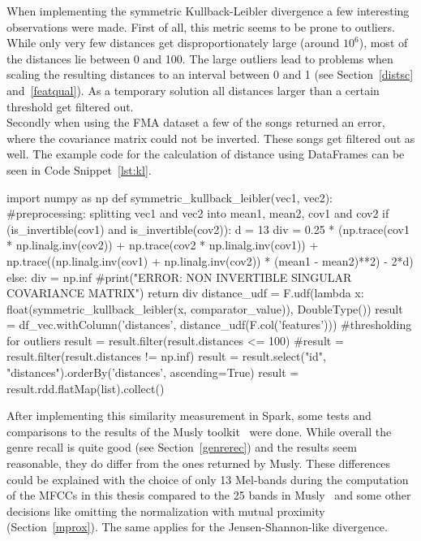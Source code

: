 When implementing the symmetric Kullback-Leibler divergence a few interesting observations were made. First of all, this metric seems to be prone to outliers. While only very few distances get disproportionately large (around $10^6$), most of the distances lie between 0 and 100. The large outliers lead to problems when scaling the resulting distances to an interval between 0 and 1 (see Section~\ref{distsc} and~\ref{featqual}). As a temporary solution all distances larger than a certain threshold get filtered out.\\ 
Secondly when using the FMA dataset a few of the songs returned an error, where the covariance matrix could not be inverted. 
These songs get filtered out as well. The example code for the calculation of distance using DataFrames can be seen in Code Snippet~\ref{lst:kl}. 

\begin{pythonCode}[frame=single,label={lst:kl},caption={Kullback-Leibler divergence},captionpos=b]
import numpy as np
def symmetric_kullback_leibler(vec1, vec2):
	#preprocessing: splitting vec1 and vec2 into mean1, mean2, cov1 and cov2
	if (is_invertible(cov1) and is_invertible(cov2)):
		d = 13
		div = 0.25 * (np.trace(cov1 * np.linalg.inv(cov2)) + np.trace(cov2 * np.linalg.inv(cov1)) + np.trace((np.linalg.inv(cov1) + np.linalg.inv(cov2)) * (mean1 - mean2)**2) - 2*d)
	else: 
		div = np.inf
		#print("ERROR: NON INVERTIBLE SINGULAR COVARIANCE MATRIX\n")  
	return div
distance_udf = F.udf(lambda x: float(symmetric_kullback_leibler(x, comparator_value)), DoubleType())
result = df_vec.withColumn('distances', distance_udf(F.col('features')))
#thresholding for outliers
result = result.filter(result.distances <= 100)  
#result = result.filter(result.distances != np.inf)        
result = result.select("id", "distances").orderBy('distances', ascending=True)
result = result.rdd.flatMap(list).collect()
\end{pythonCode}

\noindent After implementing this similarity measurement in Spark, some tests and comparisons to the results of the Musly toolkit~\cite{musly1} were done. While overall the genre recall is quite good (see Section~\ref{genrerec}) and the results seem reasonable, they do differ from the ones returned by Musly. 
These differences could be explained with the choice of only 13 Mel-bands during the computation of the MFCCs in this thesis compared to the 25 bands in Musly~\cite{musly1} and some other decisions like omitting the normalization with mutual proximity (Section~\ref{mprox}). The same applies for the Jensen-Shannon-like divergence. 


